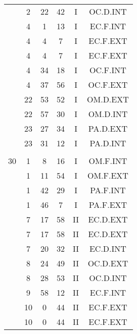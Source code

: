 \documentclass[12pt, a4paper]{article}
\begin{document}
\begin{multicols}{3}
{\begin{tabular}{c c c c c c}
	 	 	 	 & 2 & 22 & 42 & I & OC.D.INT\\%
	 	 	 	 & 4 & 1 & 13 & I & EC.F.INT\\%
	 	 	 	 & 4 & 4 & 7 & I & EC.F.EXT\\%
	 	 	 	 & 4 & 4 & 7 & I & EC.F.EXT\\%
	 	 	 	 & 4 & 34 & 18 & I & OC.F.INT\\%
	 	 	 	 & 4 & 37 & 56 & I & OC.F.EXT\\%
	 	 	 	 & 22 & 53 & 52 & I & OM.D.EXT\\%
	 	 	 	 & 22 & 57 & 30 & I & OM.D.INT\\%
	 	 	 	 & 23 & 27 & 34 & I & PA.D.EXT\\%
	 	 	 	 & 23 & 31 & 12 & I & PA.D.INT\\%
	 	 	 	 & & & & & \\%
	 	 	 	30 & 1 & 8 & 16 & I & OM.F.INT\\%
	 	 	 	 & 1 & 11 & 54 & I & OM.F.EXT\\%
	 	 	 	 & 1 & 42 & 29 & I & PA.F.INT\\%
	 	 	 	 & 1 & 46 & 7 & I & PA.F.EXT\\%
	 	 	 	 & 7 & 17 & 58 & II & EC.D.EXT\\%
	 	 	 	 & 7 & 17 & 58 & II & EC.D.EXT\\%
	 	 	 	 & 7 & 20 & 32 & II & EC.D.INT\\%
	 	 	 	 & 8 & 24 & 49 & II & OC.D.EXT\\%
	 	 	 	 & 8 & 28 & 53 & II & OC.D.INT\\%
	 	 	 	 & 9 & 58 & 12 & II & EC.F.INT\\%
	 	 	 	 & 10 & 0 & 44 & II & EC.F.EXT\\%
	 	 	 	 & 10 & 0 & 44 & II & EC.F.EXT\\%

\end{tabular}}
\end{multicols}
\end{document}
